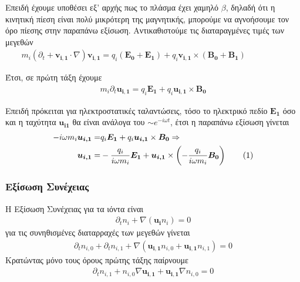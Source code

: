 \documentclass[a4paper]{article}
\newcommand\numberthis{\addtocounter{equation}{1}\tag{\theequation}}
\begin{document}
                    Επειδή έχουμε υποθέσει εξ' αρχής πως το πλάσμα έχει χαμηλό $\beta$, δηλαδή ότι η κινητική πίεση είναι πολύ μικρότερη της μαγνητικής, μπορούμε να αγνοήσουμε τον όρο πίεσης στην παραπάνω εξίσωση.
                    Aντικαθιστούμε τις διαταραγμένες τιμές των μεγεθών 
                        \begin{align*}
                            m_i (\partial_t + \bm{v_{i,1}}\cdot \nabla)\bm{v_{i,1}} = q_i(\bm{E_0}+\bm{E_1}) + q_i\bm{v_{i,1}}\times(\bm{B_0}+\bm{B_1})  \hspace{2cm} %
                        \end{align*}
                        
                    Έτσι, σε πρώτη τάξη έχουμε 
                        \begin{align}\label{eq8}
                            m_i\partial_t\bm{u_{i,1}}  = q_i \bm{E_1} + q_i\bm{u_{i,1}}\times\bm{B_0}    
                        \end{align}

                    Επειδή πρόκειται για ηλεκτροστατικές ταλαντώσεις, τόσο το ηλεκτρικό πεδίο $\bm{E_1}$ όσο και η ταχύτητα   $\bm{u_{i1}}$ θα είναι ανάλογα του $\sim e^{-i\omega t}$, έτσι η παραπάνω εξίσωση γίνεται 
                        \begin{align*}\label{eq9}
                            -i\omega m_i\bm{u_{i,1}}  =& q_i \bm{E_1} + q_i\bm{u_{i,1}}\times\bm{B_0}\Rightarrow\\
                            \bm{u_{i,1}} =& -\frac{q_i}{i\omega m_i}\bm{E_1} + \bm{u_{i,1}}\times\left(-\frac{q_i}{i\omega m_i}\bm{B_0}\right) \numberthis
                        \end{align*}

            \subsubsection*{Εξίσωση Συνέχειας}
            Η Εξίσωση Συνέχειας για τα ιόντα είναι 
                \begin{align*}
                    \partial_tn_i + \nabla(\bm{u_i}n_i) = 0 
                \end{align*}
            για τις συνηθισμένες διαταρραχές των μεγεθών γίνεται 
                \begin{align*}
                    \partial_t n_{i,0}+\partial_t n_{i,1}  + \nabla(\bm{u_{i,1}} n_{i,0}  + \bm{u_{i,1}} n_{i,1}) =0
                \end{align*}
                Κρατώντας μόνο τους όρους πρώτης τάξης παίρνουμε 
                    \begin{align}\label{eq10}
                        \partial_t n_{i,1} + n_{i,0}\nabla\bm{u_{i,1}} + \bm{u_{i,1}}\nabla n_{i,0} = 0 
                    \end{align}
        
\end{document}
